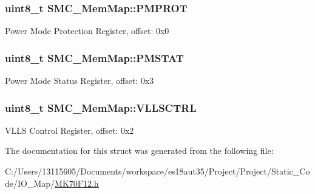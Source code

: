 \subsubsection[{P\+M\+P\+R\+O\+T}]{\setlength{\rightskip}{0pt plus 5cm}uint8\+\_\+t S\+M\+C\+\_\+\+Mem\+Map\+::\+P\+M\+P\+R\+O\+T}\label{struct_s_m_c___mem_map_afd03d93a7823dc65f53216dca15a2a95}
Power Mode Protection Register, offset\+: 0x0 \hypertarget{struct_s_m_c___mem_map_a0fddef87e229c4cf1b3be0d29589e964}{}
\subsubsection[{P\+M\+S\+T\+A\+T}]{\setlength{\rightskip}{0pt plus 5cm}uint8\+\_\+t S\+M\+C\+\_\+\+Mem\+Map\+::\+P\+M\+S\+T\+A\+T}\label{struct_s_m_c___mem_map_a0fddef87e229c4cf1b3be0d29589e964}
Power Mode Status Register, offset\+: 0x3 \hypertarget{struct_s_m_c___mem_map_ad5b37041739800b7bb7afc59d53c7ded}{}
\subsubsection[{V\+L\+L\+S\+C\+T\+R\+L}]{\setlength{\rightskip}{0pt plus 5cm}uint8\+\_\+t S\+M\+C\+\_\+\+Mem\+Map\+::\+V\+L\+L\+S\+C\+T\+R\+L}\label{struct_s_m_c___mem_map_ad5b37041739800b7bb7afc59d53c7ded}
V\+L\+L\+S Control Register, offset\+: 0x2 

The documentation for this struct was generated from the following file\+:\begin{DoxyCompactItemize}
\item 
C\+:/\+Users/13115605/\+Documents/workspace/es18aut35/\+Project/\+Project/\+Static\+\_\+\+Code/\+I\+O\+\_\+\+Map/\hyperlink{_m_k70_f12_8h}{M\+K70\+F12.\+h}\end{DoxyCompactItemize}
